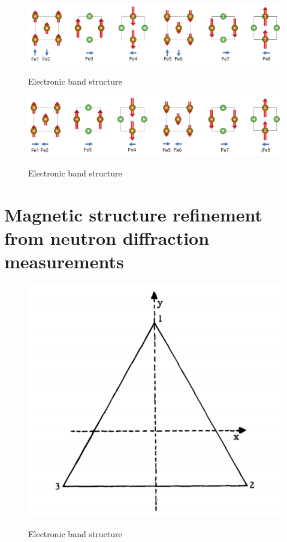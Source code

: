 \documentclass[11pt,edeposit,draftthesis]{uiucthesis2020}
\begin{document}
\begin{mainmatter}
\begin{figure}
\centering\includegraphics[width=\columnwidth]{figures/ch2/fieldlike_torque_Fe2As.png} \\
\caption{\label{fig:fieldlike_torque_Fe2As}
Electronic band structure
}
\end{figure}

\begin{figure}
\centering\includegraphics[width=\columnwidth]{figures/ch2/antidamping_torque_Fe2As.png} \\
\caption{\label{fig:antidamping_torque_Fe2As}
Electronic band structure
}
\end{figure}

\Blindtext[6]

\chapter{Magnetic structure refinement from neutron diffraction measurements}

\begin{figure}
\centering\includegraphics[width=0.5\columnwidth]{figures/ch3/C3v.png} \\
\caption{\label{fig:C3v}
Electronic band structure
}
\end{figure}


\end{mainmatter}
\end{document}
